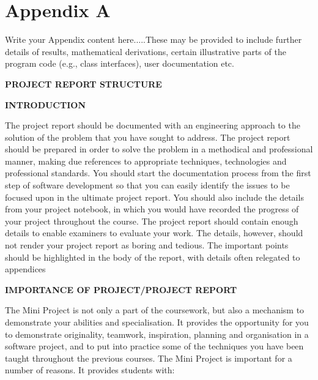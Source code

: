 
\chapter{Appendix A} %

\label{AppendixA} %


Write your Appendix content here.....These may be provided to include further details of results, mathematical derivations, certain illustrative parts of the program code (e.g., class interfaces), user documentation etc.

\textbf{\Large PROJECT REPORT STRUCTURE}

\textbf{INTRODUCTION}

The project report should be documented with an engineering approach to the solution of the problem that you have sought to address. The project report should be prepared in order to solve the problem in a methodical and professional manner, making due references to appropriate techniques, technologies and professional standards. You should start the documentation process from the first step of software development so that you can easily identify the issues to be focused upon in the ultimate project report. You should also include the details from your project notebook, in which you would have recorded the progress of your project throughout the course. The project report should contain enough details to enable examiners to evaluate your work. The
details, however, should not render your project report as boring and tedious. The important points should be highlighted in the body of the report, with details often
relegated to appendices

\textbf{IMPORTANCE OF PROJECT/PROJECT REPORT}

The Mini Project is not only a part of the coursework, but also a mechanism to demonstrate your abilities and specialisation. It provides the opportunity for you to demonstrate originality, teamwork, inspiration, planning and organisation in a software project, and to put into practice some of the techniques you have been taught throughout the previous courses. The Mini Project is important for a number of reasons. It provides students with:

